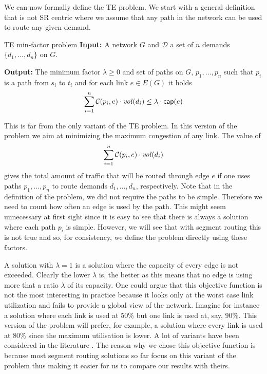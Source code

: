 We can now formally define the TE problem. We start with a general definition that is not SR centric where we assume that any path in the network can be used
to route any given demand.

\begin{problem}{TE min-factor problem}
\label{prob:tep}
\textbf{Input:} A network $G$ and $\mathcal{D}$ a set of $n$ demands $\{d_1, \ldots, d_n\}$ on $G$.

\textbf{Output:} The minimum factor $\lambda \geq 0$ and set of paths on $G$, $p_1, \ldots, p_n$ such that $p_i$ is a 
path from $s_i$ to $t_i$ and for each link $e \in E(G)$ it holds
$$
\sum_{i = 1}^n \mathcal{C}(p_i, e) \cdot \mathit{vol}(d_i) \leq \lambda \cdot \mathsf{cap}(e)
$$
\end{problem}

This is far from the only variant of the TE problem. In this version of the problem we aim at minimizing the maximum congestion of any link.
The value of
$$
\sum_{i = 1}^n \mathcal{C}(p_i, e) \cdot \mathit{vol}(d_i)
$$
gives the total amount of traffic that will be routed through edge $e$ if one uses paths $p_1, \ldots, p_n$ to route demands
$d_1, \ldots, d_n$, respectively. Note that in the definition of the problem, we did not require the paths to be simple. Therefore we need
to count how often an edge is used by the path. This might seem unnecessary at first sight since it is easy to
see that there is always a solution where each path $p_i$ is simple. However, we will see that with segment routing this
is not true and so, for consistency, we define the problem directly using these factors.

A solution with $\lambda = 1$ is a solution where the capacity of every edge
is not exceeded. Clearly the lower $\lambda$ is, the better as this means that no edge is using more that a ratio $\lambda$
of its capacity. 
One could argue that this objective function is not the most interesting in practice because it looks only at
the worst case link utilization and fails to provide a global view of the network. Imagine for instance a solution where each link
is used at $50\%$ but one link is used at, say, $90\%$. This version of the problem will prefer, for example, a solution where every link
is used at $80\%$ since the maximum utilisation is lower. A lot of variants have been considered in the literature \cite{Altin2009}.
The reason why we chose this objective function is because most segment routing solutions so far focus on this variant of the problem thus making it easier for us 
to compare our results with theirs.

